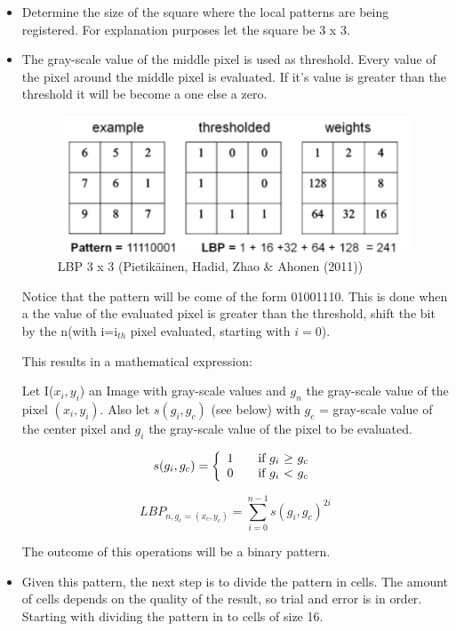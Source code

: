 \documentclass[a4paper]{article}
\begin{document}
\begin{itemize}

\item Determine the size of the square where the local patterns are being
registered. For explanation purposes let the square be 3 x 3.

\item The gray-scale value of the middle pixel is used as threshold. Every value
of the pixel around the middle pixel is evaluated. If it's value is greater than
the threshold it will be become a one else a zero.

\begin{figure}[h!]
\center
\includegraphics[scale=0.5]{lbp.png}
\caption{LBP 3 x 3 (Pietik\"ainen, Hadid, Zhao \& Ahonen (2011))}
\end{figure}

Notice that the pattern will be come of the form 01001110. This is done when a
the value of the evaluated pixel is greater than the threshold, shift the bit by
the n(with i=i$_{th}$ pixel evaluated, starting with $i=0$).

This results in a mathematical expression:

Let I($x_i, y_i$) an Image with gray-scale values and $g_n$ the gray-scale value
of the pixel $(x_i, y_i)$. Also let $s(g_i, g_c)$ (see below) with $g_c$ =
gray-scale value of the center pixel and $g_i$ the gray-scale value of the pixel
to be evaluated.

$$
  s(g_i, g_c) = \left\{
  \begin{array}{l l}
    1 & \quad \text{if $g_i$ $\geq$ $g_c$}\\
    0 & \quad \text{if $g_i$ $<$ $g_c$}\\
  \end{array} \right.
$$

$$LBP_{n, g_c = (x_c, y_c)} = \sum\limits_{i=0}^{n-1} s(g_i, g_c)^{2i} $$

The outcome of this operations will be a binary pattern.

\item Given this pattern, the next step is to divide the pattern in cells. The
amount of cells depends on the quality of the result, so trial and error is in
order. Starting with dividing the pattern in to cells of size 16.


\end{itemize}
\end{document}
